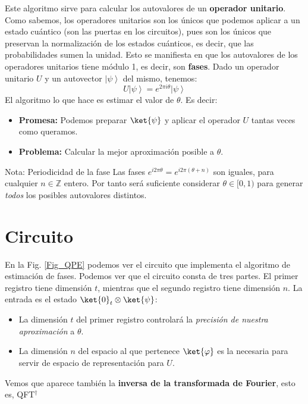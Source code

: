 \documentclass[a4paper,11pt]{book} %
\numberwithin{equation}{chapter}
\begin{document}
Este algoritmo sirve para calcular los autovalores de un \textbf{operador unitario}. Como sabemos, los operadores unitarios son los únicos que podemos aplicar a un estado cuántico (son las puertas en los circuitos), pues son los únicos que preservan la normalización de los estados cuánticos, es decir, que las probabilidades sumen la unidad. Esto se manifiesta en que los autovalores de los operadores unitarios tiene módulo 1, es decir, son \textbf{fases}. Dado un operador unitario $U$ y un autovector $\left| \psi \right\rangle$ del mismo, tenemos:
\begin{equation}
U \left| \psi \right\rangle = e^{2 \pi i \theta} \left| \psi \right\rangle
\end{equation}
El algoritmo lo que hace es estimar el valor de $\theta$. Es decir:
\begin{itemize}
	\item \textbf{Promesa:} Podemos preparar $\ket{\psi}$ y aplicar el operador $U$ tantas veces como queramos.
	\item \textbf{Problema:} Calcular la mejor aproximación posible a $\theta$.
\end{itemize}

	\begin{mybox_blue}{Nota: Periodicidad de la fase}
	Las fases  $e^{i2\pi \theta}=e^{i2\pi (\theta+n)}$  son iguales, para cualquier $n\in {\mathbb Z}$ entero. Por tanto será suficiente considerar  $\theta \in [0,1)$ para generar \textit{todos} los  posibles autovalores distintos.
	\end{mybox_blue}

\section{Circuito}

En la Fig. \ref{Fig_QPE} podemos ver el circuito que implementa el algoritmo de estimación de fases. Podemos ver que el circuito consta de tres partes. El primer registro tiene dimensión $t$, mientras que el segundo registro tiene dimensión $n$. La entrada es el estado $\ket{0}_t \otimes \ket{\psi}$:
\begin{itemize}
	\item La dimensión $t$ del primer registro controlará la \textit{precisión de nuestra aproximación} a $\theta$. 
	\item La dimensión $n$ del espacio al que pertenece $\ket{\varphi}$  es la necesaria para servir de espacio de representación para $U$.
\end{itemize}
Vemos que aparece también la \textbf{inversa de la transformada de Fourier}, esto es, QFT$^\dagger$
\end{document}
